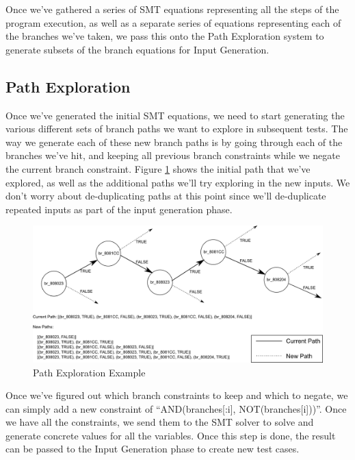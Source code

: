 Once we've gathered a series of SMT equations representing all the steps of the
program execution, as well as a separate series of equations representing each
of the branches we've taken, we pass this onto the Path Exploration system to
generate subsets of the branch equations for Input Generation.

\subsection{Path Exploration}
Once we've generated the initial SMT equations, we need to start generating the
various different sets of branch paths we want to explore in subsequent
tests. The way we generate each of these new branch paths is by going through
each of the branches we've hit, and keeping all previous branch constraints
while we negate the current branch constraint. Figure \ref{figure:pathexplore}
shows the initial path that we've explored, as well as the additional paths
we'll try exploring in the new inputs. We don't worry about de-duplicating paths
at this point since we'll de-duplicate repeated inputs as part of the input
generation phase.

\begin{figure}[ht]
 \centering
 \includegraphics{pathexplore}
 \caption{Path Exploration Example}
 \label{figure:pathexplore}
\end{figure}

Once we've figured out which branch constraints to keep and which to negate, we
can simply add a new constraint of ``AND(branches[:i], NOT(branches[i]))''. Once
we have all the constraints, we send them to the SMT solver to solve and
generate concrete values for all the variables. Once this step is done, the
result can be passed to the Input Generation phase to create new test cases.

